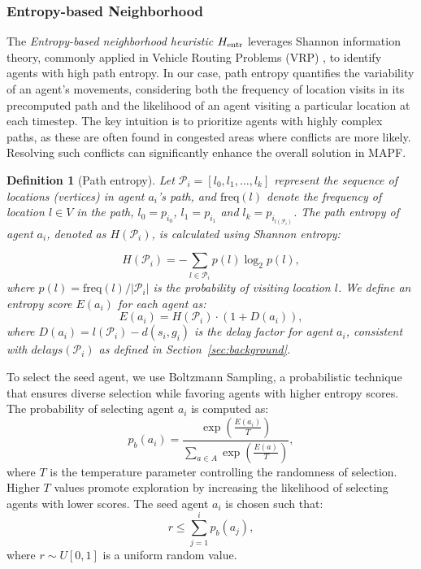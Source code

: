 \documentclass[review]{jair}
\newtheorem{definition}{Definition}
\begin{document}
\subsubsection{Entropy-based Neighborhood}
The \emph{Entropy-based neighborhood heuristic} $H_{\textnormal{entr}}$ leverages Shannon information theory, commonly applied in Vehicle Routing Problems (VRP) \citep{entropy2, entropy1}, to identify agents with high path entropy. In our case, path entropy quantifies the variability of an agent's movements, considering both the frequency of location visits in its precomputed path and the likelihood of an agent visiting a particular location at each timestep. The key intuition is to prioritize agents with highly complex paths, as these are often found in congested areas where conflicts are more likely. Resolving such conflicts can significantly enhance the overall solution in MAPF.

\begin{definition}[Path entropy]
Let \( \mathcal{P}_i = [l_0, l_1, \ldots, l_k] \) represent the sequence of locations (vertices) in agent \( a_i \)'s path, and \( \text{freq}(l) \) denote the frequency of location \( l \in V\) in the path, $l_0=p_{i_0}$, $l_1=p_{i_1}$ and $l_k=p_{i_{l(\mathcal{P}_i)}}$. The path entropy of agent \( a_i \), denoted as \( H(\mathcal{P}_i) \), is calculated using Shannon entropy:

\begin{equation}
H(\mathcal{P}_i) = -\sum_{l \in \mathcal{P}_i} p(l) \log_2 p(l),
\end{equation}
where \( p(l) = \text{freq}(l)/|\mathcal{P}_i| \) is the probability of visiting location \( l \).
We define an entropy score \( E(a_i) \) for each agent as:
\begin{equation}
E(a_i) = H(\mathcal{P}_i) \cdot (1 + D(a_i)),
\end{equation}
where \( D(a_i) = l(\mathcal{P}_i) - d(s_i, g_i) \) is the delay factor for agent \( a_i \), consistent with $\mathit{delays}(\mathcal{P}_i)$ as defined in Section~\ref{sec:background}.
\end{definition}

To select the seed agent, we use Boltzmann Sampling, a probabilistic technique that ensures diverse selection while favoring agents with higher entropy scores. The probability of selecting agent \( a_i \) is computed as:
\begin{equation}
p_b(a_i) = \frac{\exp\left(\frac{E(a_i)}{T}\right)}{\sum_{a \in A} \exp\left(\frac{E(a)}{T}\right)},
\end{equation}
where \( T \) is the temperature parameter controlling the randomness of selection. Higher \( T \) values promote exploration by increasing the likelihood of selecting agents with lower scores.
%
The seed agent \( a_i \) is chosen such that:
\begin{equation}
r \leq \sum_{j=1}^i p_b(a_j),
\end{equation}
where \( r \sim U[0, 1] \) is a uniform random value.
\end{document}
